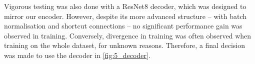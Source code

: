 Vigorous testing was also done with a ResNet8 decoder, which was designed to mirror our encoder. However, despite its more advanced structure -- with batch normalisation and shortcut connections -- no significant performance gain was observed in training. Conversely, divergence in training was often observed when training on the whole dataset, for unknown reasons. Therefore, a final decision was made to use the decoder in \cref{fig:5_decoder}.